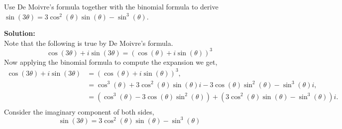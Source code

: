 \documentclass[12pt]{article}
\makeatletter
\theoremstyle{homework}
\newenvironment{exercise}[1]
{\def\@currentlabel{#1}\exercisecore}
{\endexercisecore}
\newcommand{\localhead}[1]{\par\smallskip\noindent\textbf{#1}\nobreak\\}%
\newcommand\solution{\localhead{Solution:}}
\makeatother
\begin{document}
\begin{exercise}{12a} Use De Moivre's formula together with the binomial formula to derive $\sin(3\theta) = 3\cos^2(\theta)\sin(\theta) - \sin^3(\theta)$.\\
    \solution Note that the following is true by De Moivre's formula. 
    \begin{equation*}
        \cos(3\theta) + i\sin(3\theta) = (\cos(\theta) + i\sin(\theta))^3
    \end{equation*} 
    Now applying the binomial formula to compute the expansion we get, 
    \begin{align*}
        \cos(3\theta) + i\sin(3\theta) &= (\cos(\theta) + i\sin(\theta))^3,\\
         &= \cos^3(\theta) + 3\cos^2(\theta)\sin(\theta)i - 3\cos(\theta)\sin^2(\theta) - \sin^3(\theta)i,\\
         &= (\cos^3(\theta) - 3\cos(\theta)\sin^2(\theta)) + (3\cos^2(\theta)\sin(\theta) - \sin^3(\theta))i.\\ 
    \end{align*} 
    Consider the imaginary component of both sides,
    \begin{equation*}
        \sin(3\theta) = 3\cos^2(\theta)\sin(\theta) - \sin^3(\theta)
    \end{equation*}
\end{exercise}
\vspace{.5in}
\end{document}
